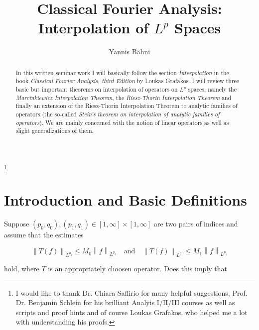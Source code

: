 
\usepackage{commath}



\begin{abstract}
	In this written seminar work I will basically follow the section \emph{Interpolation} in the book \emph{Classical Fourier Analysis, third Edition} by Loukas Grafakos. I will review three basic but important theorems on interpolation of operators on $L^p$ spaces, namely the \emph{Marcinkiewicz Interpolation Theorem}, the \emph{Riesz-Thorin Interpolation Theorem} and finally an extension of the Riesz-Thorin Interpolation Theorem to analytic families of operators (the so-called \emph{Stein's theorem on interpolation of analytic families of operators}). We are mainly concerned with the notion of linear operators as well as slight generalizations of them. 
\end{abstract}

\title{Classical Fourier Analysis: Interpolation of $L^p$ Spaces}
\author{Yannis B\"{a}hni}
\address[Yannis B\"{a}hni]{University of Zurich, R\"{a}mistrasse 71, 8006 Zurich}
\thanks{I would like to thank Dr. Chiara Saffirio for many helpful suggestions, Prof. Dr. Benjamin Schlein for his brilliant Analyis I/II/III courses as well as scripts and proof hints and of course Loukas Grafakos, who helped me a lot with understanding his proofs.}
\maketitle

\tableofcontents
\listoffigures

\mainsectionstyle

\section{Introduction and Basic Definitions}
Suppose $\left(p_0,q_0\right),\left( p_1,q_1 \right) \in [1,\infty]\times [1,\infty]$ are two pairs of indices and assume that the estimates 

\begin{equation*}
	\left\|T(f)\right\|_{L^{q_0}} \leq M_0\left\|f\right\|_{L^{p_0}} \quad \text{and} \quad \left\|T(f)\right\|_{L^{q_1}} \leq M_1\left\|f\right\|_{L^{p_1}}
\end{equation*}

\noindent hold, where $T$ is an appropriately choosen operator. Does this imply that

